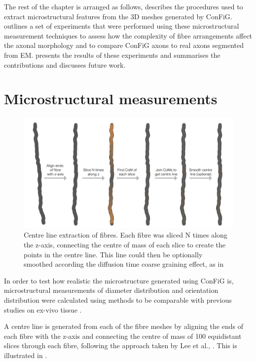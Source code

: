 The rest of the chapter is arranged as follows,  describes the procedures used to extract microstructural features from the 3D meshes generated by \ac{ConFiG}.~ outlines a set of experiments that were performed using these microstructural measurement techniques to assess how the complexity of fibre arrangements affect the axonal morphology and to compare ConFiG axons to real axons segmented from EM.  presents the results of these experiments and  summarises the contributions and discusses future work.


\section{Microstructural measurements}
\label{sec:micro_measurements}

\begin{figure}
  \centering
  \includegraphics[width=\textwidth]{figures/config/centre_line_extraction-01.png}
  \caption[Mesh centreline extraction]{Centre line extraction of fibres. Each fibre was sliced N times along the z-axis, connecting the centre of mass of each slice to create the points in the centre line. This line could then be optionally smoothed according the diffusion time coarse graining effect, as in \cite{Lee2019b}}
  \label{fig:config_micro_centreline}
\end{figure}

In order to test how realistic the microstructure generated using ConFiG is, microstructural measurements of diameter distribution and orientation distribution were calculated using methods to be comparable with previous studies on ex-vivo tissue \cite{Abdollahzadeh2019,Lee2019b}.

A centre line is generated from each of the fibre meshes by aligning the ends of each fibre with the z-axis and connecting the centre of mass of 100 equidistant slices through each fibre, following the approach taken by Lee et al., \cite{Lee2019b}. This is illustrated in .

